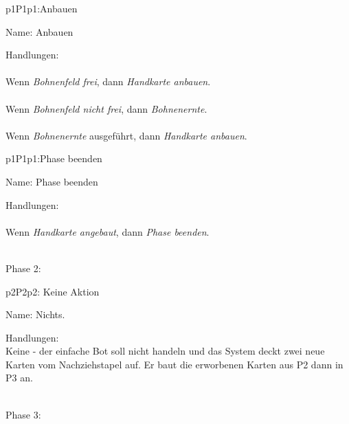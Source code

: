 \begin{description}[leftmargin=5em, style=sameline]
	
	\begin{lhp}{p1}{P1}{p1:Anbauen }
		\item [Name:] Anbauen
		\item [Handlungen:]\hfill\\ 
		\\Wenn {\itshape Bohnenfeld frei}, dann 
     	{\itshape Handkarte anbauen}.\\
     	\\Wenn {\itshape Bohnenfeld nicht frei}, dann 
		{\itshape Bohnenernte}.\\
		\\Wenn {\itshape Bohnenernte} ausgeführt, dann 
		{\itshape Handkarte anbauen}.\\
		
	\end{lhp}

	\begin{lhp}{p1}{P1}{p1:Phase beenden}
		\item [Name:] Phase beenden
		\item [Handlungen:]\hfill\\ 
		\\Wenn {\itshape Handkarte angebaut}, dann 
		{\itshape Phase beenden}.\\
	\end{lhp}	
\end{description}

\hfill\\ Phase 2:\\
\setcounter{p2}{10}

\begin{description}[leftmargin=5em, style=sameline]
	
	\begin{lhp}{p2}{P2}{p2: Keine Aktion}
		\item [Name:] Nichts.
		\item [Handlungen:]\hfill\\ 
		Keine - der einfache Bot soll nicht handeln und das System deckt zwei neue Karten vom Nachziehstapel auf. Er baut die erworbenen Karten aus P2 dann in P3 an.
	\end{lhp}
	
	
\end{description}

\hfill\\ Phase 3:\\
\setcounter{p3}{10}

